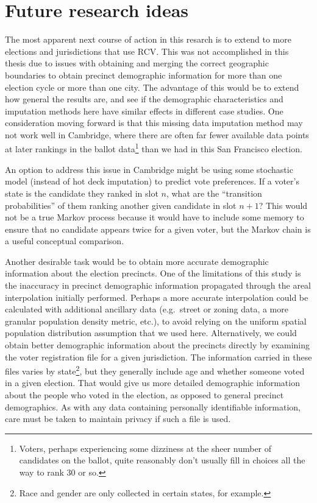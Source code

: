 \documentclass[12pt,twoside]{reedthesis}
\begin{document}
\hypertarget{further-research}{%
\section{Future research ideas}\label{further-research}}

The most apparent next course of action in this resarch is to extend to more elections and jurisdictions that use RCV. This was not accomplished in this thesis due to issues with obtaining and merging the correct geographic boundaries to obtain precinct demographic information for more than one election cycle or more than one city. The advantage of this would be to extend how general the results are, and see if the demographic characteristics and imputation methods here have similar effects in different case studies. One consideration moving forward is that this missing data imputation method may not work well in Cambridge, where there are often far fewer available data points at later rankings in the ballot data\footnote{Voters, perhaps experiencing some dizziness at the sheer number of candidates on the ballot, quite reasonably don't usually fill in choices all the way to rank 30 or so.} than we had in this San Francisco election.

An option to address this issue in Cambridge might be using some stochastic model (instead of hot deck imputation) to predict vote preferences. If a voter's state is the candidate they ranked in slot \(n\), what are the ``transition probabilities'' of them ranking another given candidate in slot \(n + 1\)? This would not be a true Markov process because it would have to include some memory to ensure that no candidate appears twice for a given voter, but the Markov chain is a useful conceptual comparison.

Another desirable task would be to obtain more accurate demographic information about the election precincts. One of the limitations of this study is the inaccuracy in precinct demographic information propagated through the areal interpolation initially performed. Perhaps a more accurate interpolation could be calculated with additional ancillary data (e.g.~street or zoning data, a more granular population density metric, etc.), to avoid relying on the uniform spatial population distribution assumption that we used here. Alternatively, we could obtain better demographic information about the precincts directly by examining the voter registration file for a given jurisdiction. The information carried in these files varies by state\footnote{Race and gender are only collected in certain states, for example.}, but they generally include age and whether someone voted in a given election. That would give us more detailed demographic information about the people who voted in the election, as opposed to general precinct demographics. As with any data containing personally identifiable information, care must be taken to maintain privacy if such a file is used.
\end{document}
